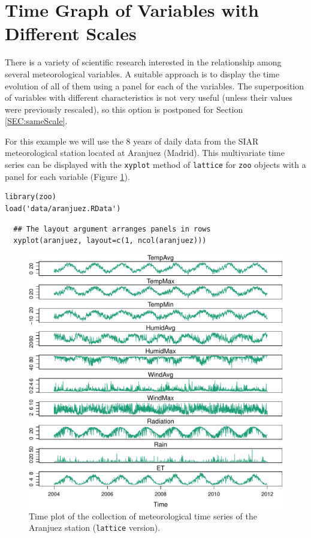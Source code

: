 \documentclass[smallroyalvopaper]{memoir}
\begin{document}
\section{Time Graph of Variables with Different Scales  \label{sec:differentVariables}}
\label{sec:orge7ada9b}
There is a variety of scientific research interested in the
relationship among several meteorological variables. A suitable
approach is to display the time evolution of all of them using a
panel for each of the variables. The superposition of variables
with different characteristics is not very useful (unless their
values were previously rescaled), so this option is postponed for
Section \ref{SEC:sameScale}.

For this example we will use the 8 years of daily data from the
SIAR meteorological station located at Aranjuez (Madrid).  This
multivariate time series can be displayed with the \texttt{xyplot} method of
\texttt{lattice} for \texttt{zoo} objects with a panel for each variable (Figure
\ref{fig:aranjuezNaive}).

\lstset{language=r,label= ,caption= ,captionpos=b,numbers=none}
\begin{lstlisting}
library(zoo)
load('data/aranjuez.RData')
\end{lstlisting}

\lstset{language=r,label= ,caption= ,captionpos=b,numbers=none}
\begin{lstlisting}
  ## The layout argument arranges panels in rows
  xyplot(aranjuez, layout=c(1, ncol(aranjuez)))
\end{lstlisting}


\begin{figure}[htbp]
\centering
\includegraphics[width=.9\linewidth]{figs/aranjuez.pdf}
\caption{Time plot of the collection of meteorological time series of the Aranjuez station (\texttt{lattice} version). \label{fig:aranjuezNaive}}
\end{figure}
\end{document}
